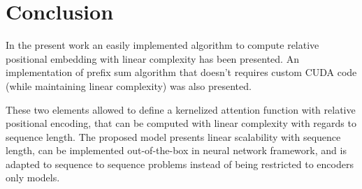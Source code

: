 \section{Conclusion}

In the present work an easily implemented algorithm to compute
\citet{shaw2018selfattention} relative
positional embedding with linear complexity has been presented. An
implementation of \citet{choromanski2021rethinking} prefix sum algorithm that doesn't requires custom CUDA
code (while maintaining linear complexity) was also presented.

These two elements allowed to define a kernelized attention function
with relative positional encoding, that can be computed with linear
complexity with regards to sequence length. The proposed model presents
linear scalability with sequence length, can be implemented out-of-the-box in neural network framework, and is adapted to sequence to sequence
problems instead of being restricted to encoders only models.

\endinput
